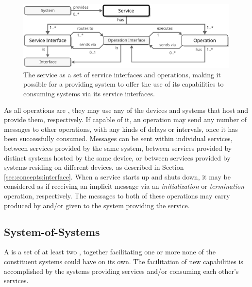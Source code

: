 \vfill

\begin{figure}[ht!]
  \centering
  \includegraphics[scale=0.9]{figures/service}
  \caption{
    The service as a set of service interfaces and operations, making it possible for a providing system to offer the use of its capabilities to consuming systems via its service interfaces.
  }
  \label{fig:service}
\end{figure}

As all operations are , they may use any  of the devices and systems that host and provide them, respectively.
If capable of it, an operation may send any number of messages to other operations, with any kinds of delays or intervals, once it has been successfully consumed.
Messages can be sent within individual services, between services provided by the same system, between services provided by distinct systems hosted by the same device, or between services provided by systems residing on different devices, as described in Section \ref{sec:concepts:interface}.
When a service starts up and shuts down, it may be considered as if receiving an implicit message via an \textit{initialization} or \textit{termination} operation, respectively.
The messages to both of these operations may carry   produced by and/or given to the system providing the service.

\subsection{System-of-Systems}
\label{sec:concepts:sos}

A  is a set of at least two , together facilitating one or more  none of the constituent systems could have on its own.
The facilitation of new capabilities is accomplished by the systems providing services and/or consuming each other's services.

